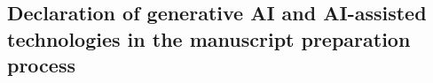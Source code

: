 \documentclass[a4paper, 12pt, fleqn]{article}
\theoremstyle{definition}
\begin{document}
%
%
%
%
%
%
%
%
%
%
%
\subsection{Declaration of generative AI and AI-assisted technologies in the manuscript preparation process}
\end{document}
